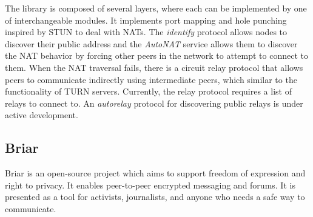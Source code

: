 The library is composed of several layers, where each can be implemented by one of interchangeable modules. It implements port mapping and hole punching inspired by STUN to deal with NATs. The \textit{identify} protocol allows nodes to discover their public address and the \textit{AutoNAT} service allows them to discover the NAT behavior by forcing other peers in the network to attempt to connect to them. When the NAT traversal fails, there is a circuit relay protocol that allows peers to communicate indirectly using intermediate peers, which similar to the functionality of TURN servers. Currently, the relay protocol requires a list of relays to connect to. An \textit{autorelay} protocol for discovering public relays is under active development.





\subsection{Briar}


Briar \cite{briar_gplay} is an open-source project which aims to support freedom of expression and right to privacy. It enables peer-to-peer encrypted messaging and forums. It is presented as a tool for activists, journalists, and anyone who needs a safe way to communicate.

